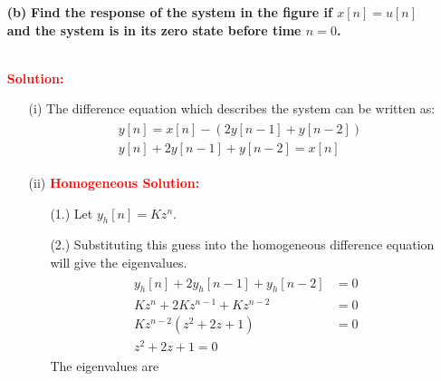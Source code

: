 \documentclass[a4paper, 12pt]{article}
\begin{document}
\begin{itemize}
\begin{itemize}
\pagebreak
\item[\textbf{(b)}]{\textbf{Find the response of the system in the figure if $x[n] = u[n]$ and the system is in its zero state before time $n=0$.}}
\begin{figure}[h!]
\end{figure} \\
\textcolor{red}{\textbf{Solution:}}
\begin{itemize}
\item[(i)]{The difference equation which describes the system can be written as:}
\begin{equation}
\begin{gathered}
\begin{alignedat}{1}
&y[n] = x[n] -\left( 2y[n-1] + y[n-2] \right)\\
&y[n] + 2y[n-1] + y[n-2] = x[n]
\end{alignedat}
\end{gathered}
\end{equation}
\item[(ii)]{\textcolor{red}{\textbf{Homogeneous Solution:}}}
\begin{itemize}
\item[(1.)]{Let $y_{h}[n] = K z^{n}$.}
\item[(2.)]{Substituting this guess into the homogeneous difference equation will give the eigenvalues.}
\begin{equation}
\begin{gathered}
\begin{alignedat}{1}
y_{h}[n] + 2 y_{h}[n-1] + y_{h}[n-2] &=0\\
Kz^{n} + 2Kz^{n-1} + Kz^{n-2} &= 0 \\
Kz^{n-2} \left(z^{2} + 2z + 1 \right) &=0 \\
z^{2} + 2z + 1 = 0
\end{alignedat}
\end{gathered}
\end{equation}
The eigenvalues are

\end{itemize}
\end{itemize}
\end{itemize}
\end{itemize}
\end{document}
